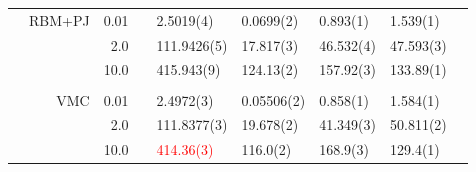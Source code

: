 \begin{table}
\begin{tabularx}{\textwidth}{R{0.5cm}rrcR{2.3cm}R{2.3cm}R{2.3cm}R{2.3cm}R{0.3cm}}
		&RBM+PJ & 0.01 && 2.5019(4) & 0.0699(2) & 0.893(1) & 1.539(1) \\
		&& 2.0 && 111.9426(5) & 17.817(3) & 46.532(4) & 47.593(3) \\
		&& 10.0 && 415.943(9) & 124.13(2) & 157.92(3) & 133.89(1) \\ 
		\hline \\
		
		&VMC & 0.01 && 2.4972(3) & 0.05506(2) & 0.858(1) & 1.584(1)\\
		&& 2.0 && 111.8377(3) & 19.678(2) & 41.349(3) & 50.811(2) \\
		&& 10.0 && \textcolor{red}{414.36(3)} & 116.0(2) & 168.9(3) & 129.4(1) \\
		\hline\hline
	\end{tabularx}
\end{table}
\fi

